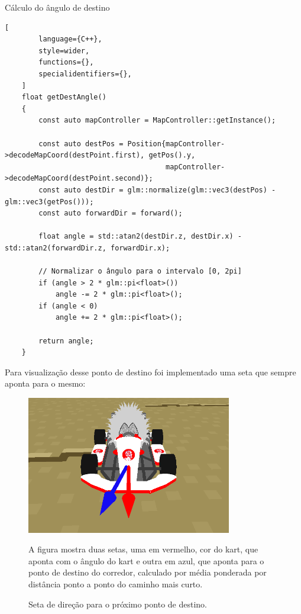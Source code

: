 \begin{programruledcaption}{Cálculo do ângulo de destino}
    \begin{lstlisting}[
        language={C++},
        style=wider,
        functions={},
        specialidentifiers={},
    ]
    float getDestAngle()
	{
		const auto mapController = MapController::getInstance();

		const auto destPos = Position{mapController->decodeMapCoord(destPoint.first), getPos().y,
									  mapController->decodeMapCoord(destPoint.second)};
		const auto destDir = glm::normalize(glm::vec3(destPos) - glm::vec3(getPos()));
		const auto forwardDir = forward();

		float angle = std::atan2(destDir.z, destDir.x) - std::atan2(forwardDir.z, forwardDir.x);

		// Normalizar o ângulo para o intervalo [0, 2pi]
		if (angle > 2 * glm::pi<float>())
			angle -= 2 * glm::pi<float>();
		if (angle < 0)
			angle += 2 * glm::pi<float>();

		return angle;
	}
    \end{lstlisting}
\end{programruledcaption}

Para visualização desse ponto de destino foi implementado uma seta que sempre aponta para o mesmo:

\begin{figure}[H]
    \centering
    \includegraphics[width=0.8\textwidth]{figuras/direção.png}
    \caption{Seta de direção para o próximo ponto de destino.}
    \footnotesize{A figura mostra duas setas, uma em vermelho, cor do kart, que aponta com o ângulo do kart e outra em azul, que aponta para o ponto de destino do corredor, calculado por média ponderada por distância ponto a ponto do caminho mais curto.}
    \label{fig:arrow}
\end{figure}

